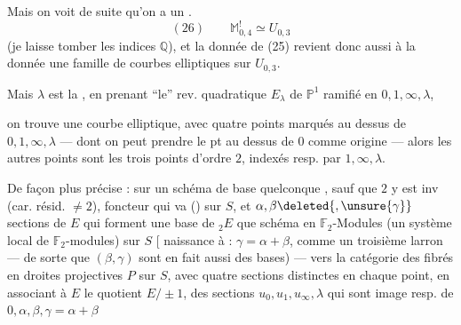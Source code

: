 Mais on voit de suite qu'on a un .
\[
(26)\qquad \mathbb{M}_{0,4}^{!}\simeq U_{0,3}
\]
(je laisse tomber les indices $\mathbb{Q}$), et la donnée de (25) revient donc aussi à la donnée une famille de courbes elliptiques sur $U_{0,3}$.

Mais  $\lambda$ est la , en prenant ``le'' rev. quadratique $E_\lambda$ de  $\mathbb{P}^1$ ramifié en $0,1,\infty,\lambda$,


on trouve une courbe elliptique, avec quatre points marqués  au dessus de $0,1,\infty,\lambda$ --- dont on peut prendre le pt au dessus de $0$ comme origine --- alors les autres points sont les trois points d'ordre $2$, indexés resp. par $1,\infty,\lambda$.

De façon plus précise : sur un schéma de base quelconque , sauf que $2$ y est inv (car. résid.  $\ne 2$),   foncteur qui va     ()   sur $S$, et  $\alpha,\beta\deleted{,\unsure{\gamma}}$   sections de $E$ qui forment une base de ${}_2E$  que schéma  en $\mathbb{F}_2$-Modules (un système local de $\mathbb{F}_2$-modules) sur $S$ [ naissance à : $\gamma=\alpha+\beta$, comme un troisième larron --- de sorte que $(\beta,\gamma)$   sont en fait aussi des bases) --- vers la catégorie des fibrés en droites projectives $P$ sur $S$, avec quatre sections   distinctes en chaque point, en associant à $E$ le quotient $E/\pm1$,  des sections $u_0,u_1,u_\infty,\lambda$ qui sont image resp. de $0,\alpha,\beta,\gamma=\alpha+\beta$




